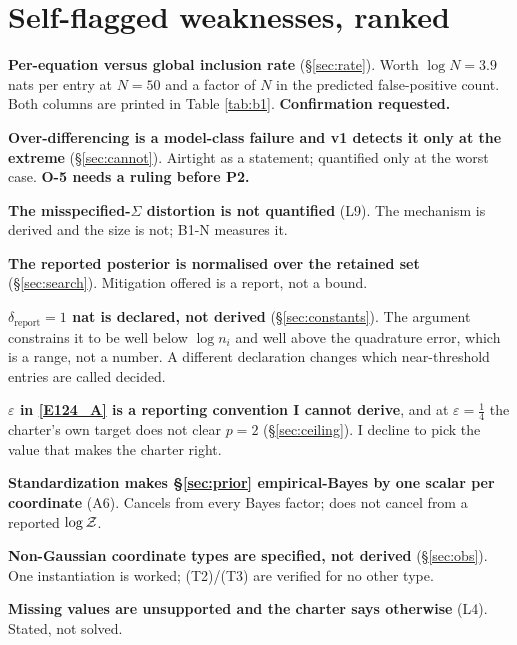 \section{Self-flagged weaknesses, ranked}

\begin{description}[leftmargin=3em, labelindent=0pt, topsep=0pt, itemsep=0pt]
\item[W-1.] \textbf{Per-equation versus global inclusion rate} (\S\ref{sec:rate}).
  Worth $\log N=3.9$ nats per entry at $N=50$ and a factor of $N$ in the predicted
  false-positive count. Both columns are printed in Table \ref{tab:b1}.
  \textbf{Confirmation requested.}
\item[W-2.] \textbf{Over-differencing is a model-class failure and v1 detects it only
  at the extreme} (\S\ref{sec:cannot}). Airtight as a statement; quantified only at
  the worst case. \textbf{O-5 needs a ruling before P2.}
\item[W-3.] \textbf{The misspecified-$\Sigma$ distortion is not quantified} (L9). The
  mechanism is derived and the size is not; B1-N measures it.
\item[W-4.] \textbf{The reported posterior is normalised over the retained set}
  (\S\ref{sec:search}). Mitigation offered is a report, not a bound.
\item[W-5.] \textbf{$\delta_{\text{report}}=1$ nat is declared, not derived}
  (\S\ref{sec:constants}). The argument constrains it to be well below $\log n_i$ and
  well above the quadrature error, which is a range, not a number. A different
  declaration changes which near-threshold entries are called decided.
\item[W-6.] \textbf{$\varepsilon$ in \eqref{E124_A} is a reporting convention I cannot
  derive}, and at $\varepsilon=\frac14$ the charter's own target does not clear $p=2$
  (\S\ref{sec:ceiling}). I decline to pick the value that makes the charter right.
\item[W-7.] \textbf{Standardization makes \S\ref{sec:prior} empirical-Bayes by one
  scalar per coordinate} (A6). Cancels from every Bayes factor; does not cancel from
  a reported $\log\mathcal{Z}$.
\item[W-8.] \textbf{Non-Gaussian coordinate types are specified, not derived}
  (\S\ref{sec:obs}). One instantiation is worked; (T2)/(T3) are verified for no other
  type.
\item[W-9.] \textbf{Missing values are unsupported and the charter says otherwise}
  (L4). Stated, not solved.
\end{description}

